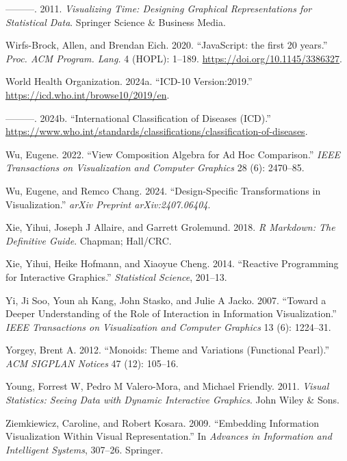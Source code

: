 \documentclass[
  openany]{book}
\newlength{\cslhangindent}
\newenvironment{CSLReferences}[2] %
 {\begin{list}{}{%
  \setlength{\itemindent}{0pt}
  \setlength{\leftmargin}{0pt}
  \setlength{\parsep}{0pt}
  \ifodd #1
   \setlength{\leftmargin}{\cslhangindent}
   \setlength{\itemindent}{-1\cslhangindent}
  \fi
  \setlength{\itemsep}{#2\baselineskip}}}
 {\end{list}}
\theoremstyle{definition}
\theoremstyle{definition}
\theoremstyle{definition}
\theoremstyle{definition}
\theoremstyle{remark}
\begin{document}
\begin{CSLReferences}{1}{0}
---------. 2011. \emph{Visualizing Time: Designing Graphical Representations for Statistical Data}. Springer Science \& Business Media.

Wirfs-Brock, Allen, and Brendan Eich. 2020. {``{JavaScript: the first 20 years}.''} \emph{Proc. ACM Program. Lang.} 4 (HOPL): 1--189. \url{https://doi.org/10.1145/3386327}.

World Health Organization. 2024a. {``{ICD-10 Version:2019}.''} \url{https://icd.who.int/browse10/2019/en}.

---------. 2024b. {``{International Classification of Diseases (ICD)}.''} \url{https://www.who.int/standards/classifications/classification-of-diseases}.

Wu, Eugene. 2022. {``View Composition Algebra for Ad Hoc Comparison.''} \emph{IEEE Transactions on Visualization and Computer Graphics} 28 (6): 2470--85.

Wu, Eugene, and Remco Chang. 2024. {``Design-Specific Transformations in Visualization.''} \emph{arXiv Preprint arXiv:2407.06404}.

Xie, Yihui, Joseph J Allaire, and Garrett Grolemund. 2018. \emph{R Markdown: The Definitive Guide}. Chapman; Hall/CRC.

Xie, Yihui, Heike Hofmann, and Xiaoyue Cheng. 2014. {``Reactive Programming for Interactive Graphics.''} \emph{Statistical Science}, 201--13.

Yi, Ji Soo, Youn ah Kang, John Stasko, and Julie A Jacko. 2007. {``Toward a Deeper Understanding of the Role of Interaction in Information Visualization.''} \emph{IEEE Transactions on Visualization and Computer Graphics} 13 (6): 1224--31.

Yorgey, Brent A. 2012. {``Monoids: Theme and Variations (Functional Pearl).''} \emph{ACM SIGPLAN Notices} 47 (12): 105--16.

Young, Forrest W, Pedro M Valero-Mora, and Michael Friendly. 2011. \emph{Visual Statistics: Seeing Data with Dynamic Interactive Graphics}. John Wiley \& Sons.

Ziemkiewicz, Caroline, and Robert Kosara. 2009. {``Embedding Information Visualization Within Visual Representation.''} In \emph{Advances in Information and Intelligent Systems}, 307--26. Springer.

\end{CSLReferences}
\end{document}
